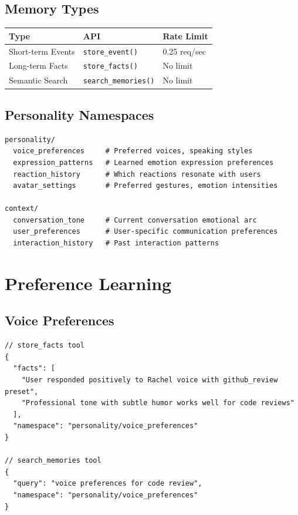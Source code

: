 \documentclass[11pt,letterpaper]{article}
\begin{document}
\subsection{Memory Types}

\begin{center}
\begin{tabular}{lll}
\toprule
\textbf{Type} & \textbf{API} & \textbf{Rate Limit} \\
\midrule
Short-term Events & \texttt{store\_event()} & 0.25 req/sec \\
Long-term Facts & \texttt{store\_facts()} & No limit \\
Semantic Search & \texttt{search\_memories()} & No limit \\
\bottomrule
\end{tabular}
\end{center}

\subsection{Personality Namespaces}

\begin{lstlisting}[language={}, caption=Namespace Organization]
personality/
  voice_preferences     # Preferred voices, speaking styles
  expression_patterns   # Learned emotion expression preferences
  reaction_history      # Which reactions resonate with users
  avatar_settings       # Preferred gestures, emotion intensities

context/
  conversation_tone     # Current conversation emotional arc
  user_preferences      # User-specific communication preferences
  interaction_history   # Past interaction patterns
\end{lstlisting}

\section{Preference Learning}

\subsection{Voice Preferences}

\begin{lstlisting}[language={}, caption=Storing Voice Preferences (MCP Tool Calls)]
// store_facts tool
{
  "facts": [
    "User responded positively to Rachel voice with github_review preset",
    "Professional tone with subtle humor works well for code reviews"
  ],
  "namespace": "personality/voice_preferences"
}

// search_memories tool
{
  "query": "voice preferences for code review",
  "namespace": "personality/voice_preferences"
}
\end{lstlisting}
\end{document}
